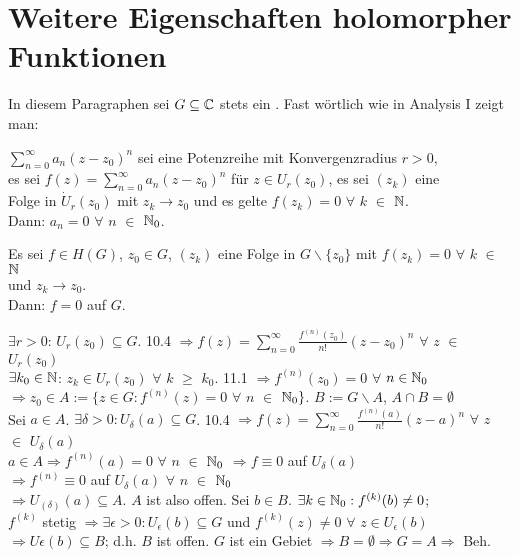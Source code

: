 \documentclass[a4paper,twoside,DIV15,BCOR12mm]{scrbook}
\begin{document}
\chapter{Weitere Eigenschaften holomorpher Funktionen}

In diesem Paragraphen sei $G \subseteq \mathbb{C}$ stets ein . Fast wörtlich wie in Analysis I zeigt man:

\begin{satz}
$\sum\limits_{n=0}^{\infty}a_n(z-z_0)^n$ sei eine Potenzreihe mit Konvergenzradius $r>0$, \\
es sei $f(z)=\sum\limits_{n=0}^{\infty}a_n(z-z_0)^n$ für $z \in U_r(z_0)$, es sei $(z_k)$ eine \\
Folge in $\dot U_r(z_0)$ mit $z_k \to z_0$ und es gelte $f(z_k) = 0$  $\forall$ $k$ $\in$ $\mathbb{N}$. \\
Dann: $a_n = 0$ $\forall$ $n$ $\in$ $\mathbb{N}_0$.
\end{satz}

\begin{satz}
Es sei $f \in H(G)$, $z_0 \in G$, $(z_k)$ eine Folge in $G\backslash\{z_0\}$ mit $f(z_k) = 0$ $\forall$ $k$ $\in$ $\mathbb{N}$\\
und $ z_k \to z_0$.\\
Dann: $f = 0$ auf $G$.
\end{satz}

\begin{beweis}
$\exists r > 0$: $U_r(z_0) \subseteq G$. 10.4 $\Rightarrow f(z) = \sum\limits_{n=0}^{\infty} \frac{f^{(n)}(z_0)}{n!}(z-z_0)^n$ $\forall$ $z$ $\in$ $U_r(z_0)$\\
$\exists k_0 \in \mathbb{N}$: $z_k \in U_r(z_0)$ $\forall$ $k$ $\geq$ $k_0$. 11.1 $\Rightarrow f^{(n)}(z_0) = 0$ $\forall$ $n \in \mathbb{N}_0$\\
$\Rightarrow z_0 \in A := \{z \in G: f^{(n)}(z) = 0$ $\forall$ $n$ $\in$ $\mathbb{N}_0\}$. $B:= G\backslash A$, $A \cap B = \emptyset$\\
Sei $ a \in A$. $\exists \delta > 0: U_{\delta}(a) \subseteq G$. 10.4 $\Rightarrow f(z) = \sum\limits_{n=0}^{\infty} \frac{f^{(n)}(a)}{n!}(z-a)^n$ $\forall$ $z$ $\in$ $U_{\delta}(a)$\\
$a \in A \Rightarrow f^{(n)}(a) = 0$ $\forall$ $n$ $\in$ $\mathbb{N}_0$ $\Rightarrow f \equiv 0$ auf $U_{\delta}(a)$\\
$\Rightarrow f^{(n)} \equiv 0$ auf $U_{\delta}(a)$ $\forall$ $n$ $\in$ $\mathbb{N}_0$\\
$\Rightarrow U_{(\delta)}(a) \subseteq A$. $A$ ist also offen. Sei $b \in B$. $\exists k \in \mathbb{N}_0: f^{(k)}(b) \neq 0$; \\
$f^{(k)}$ stetig $\Rightarrow \exists \epsilon > 0: U_{\epsilon}(b) \subseteq G$ und $f^{(k)}(z) \neq 0$ $\forall$ $z \in U_{\epsilon}(b)$\\
$\Rightarrow U{\epsilon}(b) \subseteq B$; d.h. $B$ ist offen. $G$ ist ein Gebiet $\Rightarrow B = \emptyset \Rightarrow G = A \Rightarrow$ Beh.
\end{beweis}
\end{document}
